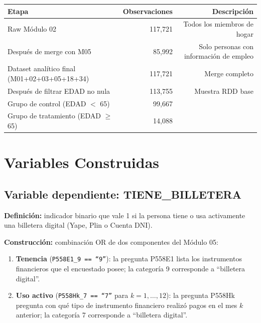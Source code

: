 \documentclass[12pt, a4paper]{article}
\begin{document}
\begin{center}
\begin{tabular}{lrr}
\toprule
Etapa & Observaciones & Descripción \\\midrule
Raw Módulo 02 & 117{,}721 & Todos los miembros de hogar \\
Después de merge con M05 & 85{,}992 & Solo personas con información de empleo \\
Dataset analítico final (M01+02+03+05+18+34) & 117{,}721 & Merge completo \\
Después de filtrar EDAD no nula & 113{,}755 & Muestra RDD base \\
\quad Grupo de control (EDAD $<$ 65) & 99{,}667 & \\
\quad Grupo de tratamiento (EDAD $\geq$ 65) & 14{,}088 & \\
\bottomrule
\end{tabular}
\end{center}

\section{Variables Construidas}

\subsection{Variable dependiente: TIENE\_BILLETERA}

\textbf{Definición:} indicador binario que vale 1 si la persona tiene o usa
activamente una billetera digital (Yape, Plin o Cuenta DNI).

\textbf{Construcción:} combinación OR de dos componentes del Módulo 05:

\begin{enumerate}[noitemsep]
  \item \textbf{Tenencia} (\texttt{P558E1\_9 == ``9''}): la pregunta P558E1
    lista los instrumentos financieros que el encuestado posee; la categoría
    9 corresponde a ``billetera digital''.
  \item \textbf{Uso activo} (\texttt{P558Hk\_7 == ``7''} para
    $k = 1, \ldots, 12$): la pregunta P558Hk pregunta con qué tipo de
    instrumento financiero realizó pagos en el mes $k$ anterior; la
    categoría 7 corresponde a ``billetera digital''.
\end{enumerate}
\end{document}
